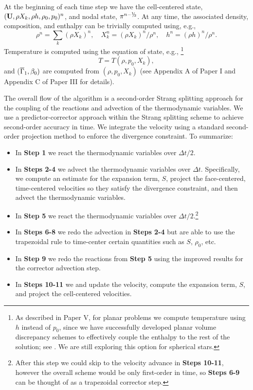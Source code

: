 At the beginning of each time step we have the cell-centered state,
$({\bf{U}},\rho X_k,\rho h,\rho_0,p_0)^n$, and nodal state, $\pi^{n-\myhalf}$.
At any time, the associated density, composition, and enthalpy can be trivially computed using, e.g.,
\begin{equation}
\rho^n = \sum_k(\rho X_k)^n, \quad
X_k^n = (\rho X_k)^n / \rho^n, \quad
h^n = (\rho h)^n / \rho^n.
\end{equation}
Temperature is computed using the equation of state, e.g.,
\footnote{As described in Paper V, for planar problems we compute temperature using $h$ instead of $p_0$, since we have successfully developed planar volume discrepancy schemes to effectively couple the enthalpy to the rest of the solution; see \cite{XRB_I}.  We are still exploring this option for spherical stars.}
\begin{equation}
T = T(\rho,p_0,X_k),
\end{equation}
and ($\overline{\Gamma}_1,\beta_0)$ are computed from $(\rho,p_0,X_k)$ (see Appendix A of Paper I and Appendix C of Paper III for details).

The overall flow of the algorithm is a second-order Strang splitting approach for the coupling of the reactions and advection of the thermodynamic variables.  
We use a predictor-corrector approach within the Strang splitting scheme to achieve second-order accuracy in time.
We integrate the velocity using a standard second-order projection method to enforce the divergence constraint.
To summarize:
\begin{itemize}
\item In {\bf Step 1} we react the thermodynamic variables over $\Delta t/2$.
\item In {\bf Steps 2-4} we advect the thermodynamic variables over $\Delta t$.  Specifically, we compute an estimate for the expansion term, $S$, project the face-centered, time-centered velocities so they satisfy the divergence constraint, and then advect the thermodynamic variables.
\item In {\bf Step 5} we react the thermodynamic variables over $\Delta t/2$.\footnote{After this step we could skip to the velocity advance in {\bf Steps 10-11}, however the overall scheme would be only first-order in time, so {\bf Steps 6-9} can be thought of as a trapezoidal corrector step.}
\item In {\bf Steps 6-8} we redo the advection in {\bf Steps 2-4} but are able to use the trapezoidal rule to time-center certain quantities such as $S$, $\rho_0$, etc.
\item In {\bf Step 9} we redo the reactions from {\bf Step 5} using the improved results for the corrector advection step.
\item In {\bf Steps 10-11} we and update the velocity, compute the expansion term, $S$, and project the cell-centered velocities.
\end{itemize}

